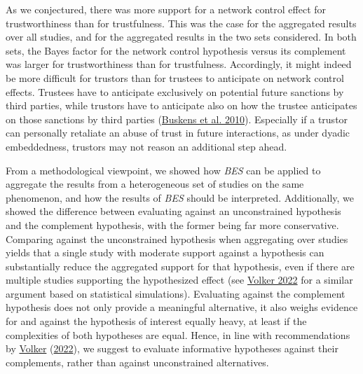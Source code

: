 \documentclass[
  11pt,
]{article}
\begin{document}
As we conjectured, there was more support for a network control effect for trustworthiness than for trustfulness.
This was the case for the aggregated results over all studies, and for the aggregated results in the two sets considered.
In both sets, the Bayes factor for the network control hypothesis versus its complement was larger for trustworthiness than for trustfulness.
Accordingly, it might indeed be more difficult for trustors than for trustees to anticipate on network control effects.
Trustees have to anticipate exclusively on potential future sanctions by third parties, while trustors have to anticipate also on how the trustee anticipates on those sanctions by third parties (\protect\hyperlink{ref-buskens_raub_veer_triads_2010}{Buskens et al. 2010}).
Especially if a trustor can personally retaliate an abuse of trust in future interactions, as under dyadic embeddedness, trustors may not reason an additional step ahead.

From a methodological viewpoint, we showed how \emph{BES} can be applied to aggregate the results from a heterogeneous set of studies on the same phenomenon, and how the results of \emph{BES} should be interpreted.
Additionally, we showed the difference between evaluating against an unconstrained hypothesis and the complement hypothesis, with the former being far more conservative.
Comparing against the unconstrained hypothesis when aggregating over studies yields that a single study with moderate support against a hypothesis can substantially reduce the aggregated support for that hypothesis, even if there are multiple studies supporting the hypothesized effect (see \protect\hyperlink{ref-volker_bes_2022}{Volker 2022} for a similar argument based on statistical simulations).
Evaluating against the complement hypothesis does not only provide a meaningful alternative, it also weighs evidence for and against the hypothesis of interest equally heavy, at least if the complexities of both hypotheses are equal.
Hence, in line with recommendations by \protect\hyperlink{ref-volker_bes_2022}{Volker} (\protect\hyperlink{ref-volker_bes_2022}{2022}), we suggest to evaluate informative hypotheses against their complements, rather than against unconstrained alternatives.
\end{document}
